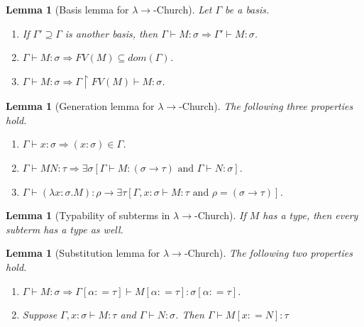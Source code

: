 \documentclass{llncs}
\newcommand{\lambdasystem}[0]{{\lambda}{\rightarrow}}
\theoremstyle{definition}
\numberwithin{mydef}{subsection}
\theoremstyle{plain}
\newtheorem{mylm}[mydef]{Lemma}
\theoremstyle{remark}
\begin{document}
	\begin{mylm}[Basis lemma for $\lambdasystem$-Church]
		Let $\Gamma$ be a basis.
		\begin{enumerate}
			\item If $\Gamma ' \supseteq \Gamma$ is another basis, then $\Gamma \vdash M : \sigma \Rightarrow \Gamma ' \vdash M : \sigma$.
			\item $\Gamma \vdash M : \sigma \Rightarrow FV {\left( M \right)} \subseteq dom {\left( \Gamma \right)}$.
			\item $\Gamma \vdash M : \sigma \Rightarrow \Gamma \upharpoonright FV {\left( M \right)} \vdash M : \sigma$. \\
		\end{enumerate}
	\end{mylm}
	
	\begin{mylm}[Generation lemma for $\lambdasystem$-Church]
		The following three properties hold.
		\begin{enumerate}
			\item $\Gamma \vdash x : \sigma \Rightarrow \left( x {:} \sigma \right) \in \Gamma$.
			\item $\Gamma \vdash M N : \tau \Rightarrow \exists \sigma \left[ \Gamma \vdash M : \left( \sigma \rightarrow \tau \right) \text{ and } \Gamma \vdash N : \sigma \right]$.
			\item $\Gamma \vdash \left( \lambda x {:} \sigma . M \right) : \rho \rightarrow \exists \tau [\Gamma , x {:} \sigma \vdash M : \tau \text{ and } \rho = \left( \sigma \rightarrow \tau \right)]$.
		\end{enumerate}
	\end{mylm}
	
	\begin{mylm}[Typability of subterms in $\lambdasystem$-Church]
		If $M$ has a type, then every subterm has a type as well.
	\end{mylm}
	
	\begin{mylm}[Substitution lemma for $\lambdasystem$-Church]
		The following two properties hold.
		\begin{enumerate}
			\item $\Gamma \vdash M : \sigma \Rightarrow \Gamma {\left[ \alpha : = \tau \right]} \vdash M {\left[ \alpha : = \tau \right]} : \sigma {\left[ \alpha : = \tau \right]}$.
			\item Suppose $\Gamma, x {:} \sigma \vdash M : \tau$ and $\Gamma \vdash N : \sigma$. Then $\Gamma \vdash M {\left[ x : = N \right]} : \tau$
		\end{enumerate}
	\end{mylm}
	
\end{document}
